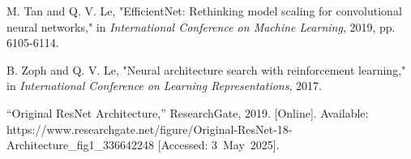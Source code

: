 \begin{thebibliography}{00}
 M. Tan and Q. V. Le, "EfficientNet: Rethinking model scaling for convolutional neural networks," in \textit{International Conference on Machine Learning}, 2019, pp. 6105-6114.

 B. Zoph and Q. V. Le, "Neural architecture search with reinforcement learning," in \textit{International Conference on Learning Representations}, 2017.

“Original ResNet Architecture,” ResearchGate, 2019. [Online].  
Available: https://www.researchgate.net/figure/Original-ResNet-18-Architecture\_fig1\_336642248  
[Accessed: 3~May~2025].
\end{thebibliography}
